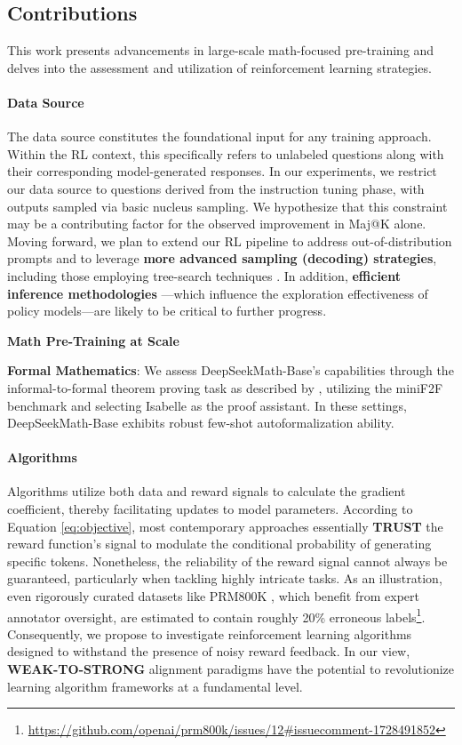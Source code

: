 \subsection{Contributions}
This work presents advancements in large-scale math-focused pre-training and delves into the assessment and utilization of reinforcement learning strategies.

\paragraph{Data Source} The data source constitutes the foundational input for any training approach. Within the RL context, this specifically refers to unlabeled questions along with their corresponding model-generated responses. In our experiments, we restrict our data source to questions derived from the instruction tuning phase, with outputs sampled via basic nucleus sampling. We hypothesize that this constraint may be a contributing factor for the observed improvement in Maj@K alone. Moving forward, we plan to extend our RL pipeline to address out-of-distribution prompts and to leverage \textbf{more advanced sampling (decoding) strategies}, including those employing tree-search techniques \citep{yao2023tree}. In addition, \textbf{efficient inference methodologies} \citep{xia-etal-2023-speculative,leviathan2023fast,kwon2023efficient,xia2024unlocking}—which influence the exploration effectiveness of policy models—are likely to be critical to further progress.

\textbf{Math Pre-Training at Scale}

\item \textbf{Formal Mathematics}: We assess DeepSeekMath-Base’s capabilities through the informal-to-formal theorem proving task as described by \citep{dsp_proof}, utilizing the miniF2F benchmark \citep{minif2f} and selecting Isabelle \citep{isabelle} as the proof assistant. In these settings, DeepSeekMath-Base exhibits robust few-shot autoformalization ability.

\paragraph{Algorithms} Algorithms utilize both data and reward signals to calculate the gradient coefficient, thereby facilitating updates to model parameters. According to Equation \ref{eq:objective}, most contemporary approaches essentially \textbf{TRUST} the reward function's signal to modulate the conditional probability of generating specific tokens. Nonetheless, the reliability of the reward signal cannot always be guaranteed, particularly when tackling highly intricate tasks. As an illustration, even rigorously curated datasets like PRM800K \citep{lightman2023let}, which benefit from expert annotator oversight, are estimated to contain roughly 20\% erroneous labels\footnote{\url{https://github.com/openai/prm800k/issues/12\#issuecomment-1728491852}}. Consequently, we propose to investigate reinforcement learning algorithms designed to withstand the presence of noisy reward feedback. In our view, \textbf{WEAK-TO-STRONG} alignment paradigms \citep{burns2023weak} have the potential to revolutionize learning algorithm frameworks at a fundamental level.


